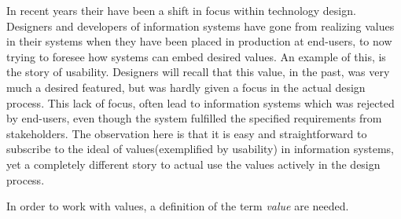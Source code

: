 In recent years their have been a shift in focus within technology design. Designers and developers of information systems have gone from realizing values in their systems when they have been placed in production at end-users, to now trying to foresee how systems can embed desired values.\newline 
An example of this, is the story of usability. Designers will recall that this value, in the past, was very much a desired featured, but was hardly given a focus in the actual design process. This lack of focus, often lead to information systems which was rejected by end-users, even though the system fulfilled the specified requirements from stakeholders.\newline
The observation here is that it is easy and straightforward to subscribe to the ideal of values(exemplified by usability) in information systems, yet a completely different story to actual use the values actively in the design process.

In order to work with values, a definition of the term \textit{value} are needed. 
 \newline



